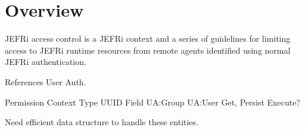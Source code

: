 \documentclass{article}
\begin{document}
\maketitle
\tableofcontents
\newpage
\linespread{1.6}

\section{Overview}
JEFRi access control is a JEFRi context and a series of guidelines for limiting
access to JEFRi runtime resources from remote agents identified using normal
JEFRi authentication.

References User Auth.

Permission
	Context
		Type
			UUID
				Field
	UA:Group
		UA:User
	Get, Persist
	Execute?

Need efficient data structure to handle these entities.
\end{document}
